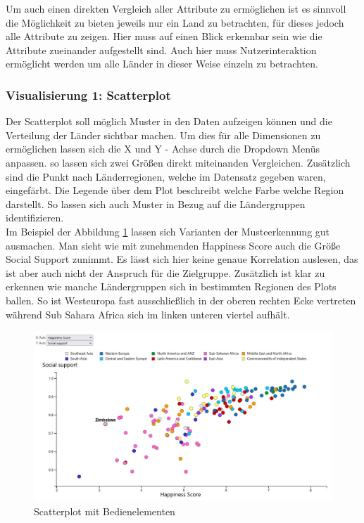 Um auch einen direkten Vergleich aller Attribute zu ermöglichen ist es sinnvoll die Möglichkeit zu bieten jeweils nur ein Land zu betrachten, für dieses jedoch alle Attribute zu zeigen. Hier muss auf einen Blick erkennbar sein wie die Attribute zueinander aufgestellt sind. Auch hier muss Nutzerinteraktion ermöglicht werden um alle Länder in dieser Weise einzeln zu betrachten. \\

\subsubsection{Visualisierung 1: Scatterplot}

Der Scatterplot soll möglich Muster in den Daten aufzeigen können und die Verteilung der Länder sichtbar machen. Um dies für alle Dimensionen zu ermöglichen lassen sich die X und Y - Achse durch die Dropdown Menüs anpassen. so lassen sich zwei Größen direkt miteinanden Vergleichen. Zusätzlich sind die Punkt nach Länderregionen, welche im Datensatz gegeben waren, eingefärbt. Die Legende über dem Plot beschreibt welche Farbe welche Region darstellt. So lassen sich auch Muster in Bezug auf die Ländergruppen identifizieren. \\

Im Beispiel der Abbildung \ref{fig:scatterplot} lassen sich Varianten der Musteerkennung gut ausmachen. Man sieht wie mit zunehmenden Happiness Score auch die Größe Social Support zunimmt. Es lässt sich hier keine genaue Korrelation auslesen, das ist aber auch nicht der Anspruch für die Zielgruppe. Zusätzlich ist klar zu erkennen wie manche Ländergruppen sich in bestimmten Regionen des Plots ballen. So ist Westeuropa fast ausschließlich in der oberen rechten Ecke vertreten während Sub Sahara Africa sich im linken unteren viertel aufhält. 

\begin{figure}[h]
 \centering
 \includegraphics[width = \textwidth]{img/scatterplot.jpg}
 \caption{Scatterplot mit Bedienelementen}
 \label{fig:scatterplot}
\end{figure}


